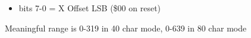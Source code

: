 \begin{itemize}
\item bits 7-0 = X Offset LSB (\$00 on reset)
\end{itemize}
Meaningful range is 0-319 in 40 char mode, 0-639 in 80 char mode

